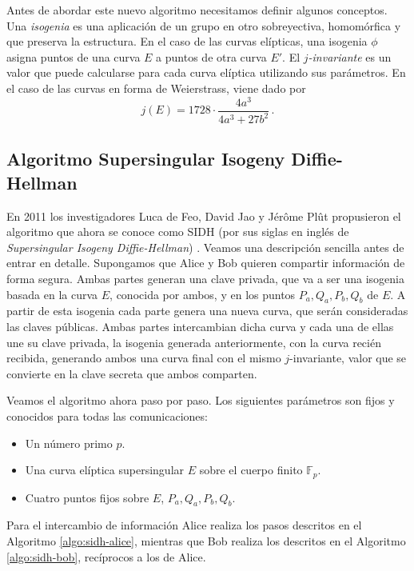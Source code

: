 \documentclass[
  a4paper,
  12pt,
  spanish,
]{scrartcl}
\begin{document}
Antes de abordar este nuevo algoritmo necesitamos definir algunos conceptos.
Una \textit{isogenia} es una aplicación de un grupo en otro sobreyectiva, homomórfica y que preserva la estructura.
En el caso de las curvas elípticas, una isogenia \(\phi\) asigna puntos de una curva \(E\) a puntos de otra curva \(E'\).
El \(j\)\textit{-invariante} es un valor que puede calcularse para cada curva elíptica utilizando sus parámetros. En el caso de las curvas en forma de Weierstrass, viene dado por \[
  j(E) = 1728 \cdot \frac{4a^3}{4a^3 + 27b^2}\,.
\]

\subsection{Algoritmo Supersingular Isogeny Diffie-Hellman}

En 2011 los investigadores Luca de Feo, David Jao y Jérôme Plût propusieron el algoritmo que ahora se conoce como SIDH (por sus siglas en inglés de \textit{Supersingular Isogeny Diffie-Hellman}) \parencite{yang_towards_2011}.
Veamos una descripción sencilla antes de entrar en detalle.
Supongamos que Alice y Bob quieren compartir información de forma segura.
Ambas partes generan una clave privada, que va a ser una isogenia basada en la curva \(E\), conocida por ambos, y en los puntos \(P_a, Q_a, P_b, Q_b\) de \(E\).
A partir de esta isogenia cada parte genera una nueva curva, que serán consideradas las claves públicas.
Ambas partes intercambian dicha curva y cada una de ellas une su clave privada, la isogenia generada anteriormente, con la curva recién recibida, generando ambos una
curva final con el mismo \(j\)-invariante, valor que se convierte en la clave secreta que ambos comparten.

Veamos el algoritmo ahora paso por paso. Los siguientes parámetros son fijos y conocidos para todas las comunicaciones:
\begin{itemize}
  \item Un número primo \(p\).
  \item Una curva elíptica supersingular \(E\) sobre el cuerpo finito \(\mathbb F_p\).
  \item Cuatro puntos fijos sobre \(E\), \(P_a, Q_a, P_b, Q_b\).
\end{itemize}
Para el intercambio de información Alice realiza los pasos descritos en el Algoritmo \ref{algo:sidh-alice}, mientras que Bob realiza los descritos en el Algoritmo \ref{algo:sidh-bob}, recíprocos a los de Alice.
\end{document}
